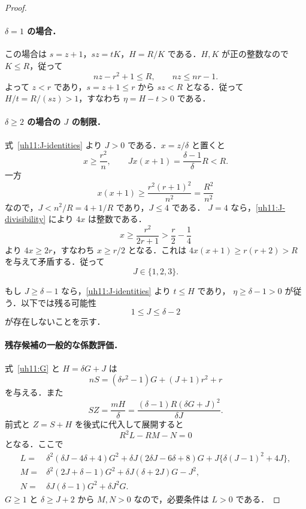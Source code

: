 \begin{proof}
\paragraph{$\delta=1$ の場合．}
この場合は $s=z+1$，$sz=tK$，$H=R/K$ である．$H,K$ が正の整数なので $K\leq R$，従って
\[
 nz-r^2+1\leq R,\qquad nz\leq nr-1.
\]
よって $z<r$ であり，$s=z+1\leq r$ から $sz<R$ となる．従って
$H/t=R/(sz)>1$，すなわち $\eta=H-t>0$ である．

\paragraph{$\delta\geq2$ の場合の $J$ の制限．}
式~\eqref{uh11:J-identities} より $J>0$ である．$x=z/\delta$ と置くと
\[
 x\geq\frac{r^2}{n},\qquad
 Jx(x+1)=\frac{\delta-1}{\delta}R<R.
\]
一方
\[
 x(x+1)\geq\frac{r^2(r+1)^2}{n^2}=\frac{R^2}{n^2}
\]
なので，$J<n^2/R=4+1/R$ であり，$J\leq4$ である．
$J=4$ なら，\eqref{uh11:J-divisibility} により $4x$ は整数である．
\[
 x\geq\frac{r^2}{2r+1}>\frac r2-\frac14
\]
より $4x\geq2r$，すなわち $x\geq r/2$ となる．これは
$4x(x+1)\geq r(r+2)>R$ を与えて矛盾する．従って
\begin{equation}\label{uh11:J-small}
 J\in\{1,2,3\}.
\end{equation}

もし $J\geq\delta-1$ なら，\eqref{uh11:J-identities} より $t\leq H$ であり，
$\eta\geq\delta-1>0$ が従う．以下では残る可能性
\begin{equation}\label{uh11:bad-range}
 1\leq J\leq\delta-2
\end{equation}
が存在しないことを示す．

\paragraph{残存候補の一般的な係数評価．}
式~\eqref{uh11:G} と $H=\delta G+J$ は
\[
 nS=(\delta r^2-1)G+(J+1)r^2+r
\]
を与える．また
\[
 SZ=\frac{mH}{\delta}
   =\frac{(\delta-1)R(\delta G+J)^2}{\delta J}.
\]
前式と $Z=S+H$ を後式に代入して展開すると
\begin{equation}\label{uh11:polynomial-elimination}
 R^2L-RM-N=0
\end{equation}
となる．ここで
\begin{align*}
 L={}&\delta^2(\delta J-4\delta+4)G^2
      +\delta J(2\delta J-6\delta+8)G
      +J\{\delta(J-1)^2+4J\},\\
 M={}&\delta^2(2J+\delta-1)G^2
      +\delta J(\delta+2J)G-J^2,\\
 N={}&\delta J(\delta-1)G^2+\delta J^2G.
\end{align*}
$G\geq1$ と $\delta\geq J+2$ から $M,N>0$ なので，必要条件は $L>0$ である．


\end{proof}
